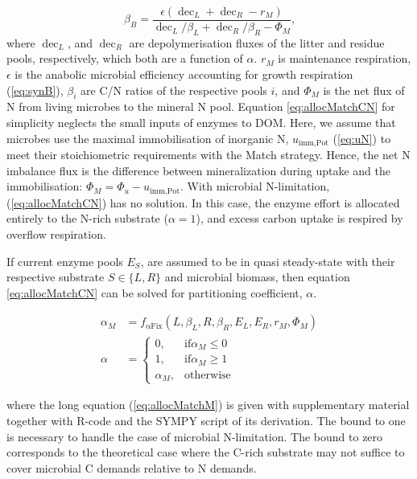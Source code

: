 \begin{equation}
\label{eq:allocMatchCN}
\beta_B = \frac{\epsilon (\operatorname{dec}_L + \operatorname{dec}_R - r_M)}{
\operatorname{dec}_L/\beta_L + \operatorname{dec}_R/\beta_R  - \Phi_M } 
\text{,}
\end{equation}
where $\operatorname{dec}_L$, and $\operatorname{dec}_R$ are depolymerisation
fluxes of the litter and residue pools, respectively, which both are a function
of $\alpha$. $r_M$ is maintenance respiration,
$\epsilon$ is the anabolic microbial efficiency accounting for growth
respiration (\ref{eq:synB}), $\beta_i$ are C/N ratios of the respective pools
$i$, and $\Phi_M$ is the net flux of N from living microbes to the mineral N
pool. Equation \ref{eq:allocMatchCN} for simplicity neglects the small inputs of
enzymes to DOM. Here, we assume that microbes use the maximal immobilisation of
inorganic N, $u_{\operatorname{imm,Pot}}$ (\ref{eq:uN}) to meet their
stoichiometric requirements with the Match strategy. Hence, the net N
imbalance flux is the difference between mineralization during uptake and the
immobilisation:
$\Phi_M = \Phi_u - u_{\operatorname{imm,Pot}}$. With microbial N-limitation,
(\ref{eq:allocMatchCN}) has no solution. In this case, the enzyme effort is
allocated entirely to the N-rich substrate ($\alpha=1$), and excess carbon uptake
is respired by overflow respiration.

If current enzyme pools $E_S$, are assumed to be in quasi steady-state with
their respective substrate $S \in \{L,R\}$ and microbial biomass, then equation
\ref{eq:allocMatchCN} can be solved for partitioning coefficient, $\alpha$.

\begin{subequations}
\label{eq:allocMatch} 
\begin{align}
\label{eq:allocMatchM} 
\alpha_M &= f_{\operatorname{{\alpha}Fix}}(L,\beta_L,R,\beta_R, E_L, E_R, r_M,
\Phi_M)
\\
\alpha &= \begin{cases}
  0,  & \text{if} \alpha_M \le 0 \\
  1,  & \text{if} \alpha_M \ge 1 \\
  \alpha_M, & \text{otherwise}
\end{cases}   
\end{align}
\end{subequations} 

\noindent where the long equation (\ref{eq:allocMatchM}) is given with
supplementary material together with R-code and the SYMPY script of its
derivation.
The bound to one is necessary to handle the case of microbial N-limitation. The
bound to zero corresponds to the theoretical case where the C-rich substrate may
not suffice to cover microbial C demands relative to N demands.

